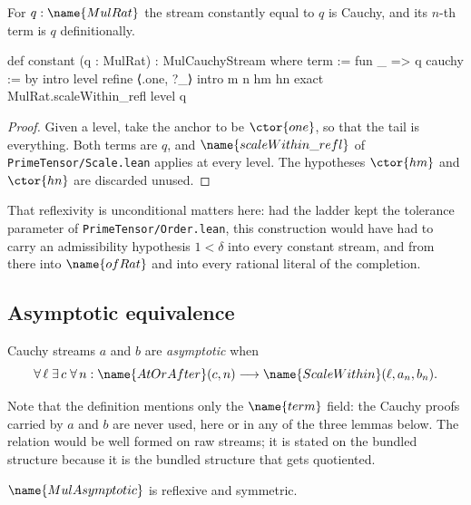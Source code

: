 \begin{lemma}
\label{Completion:lem:constant}
For $q : \name{MulRat}$ the stream constantly equal to $q$ is Cauchy, and its
$n$-th term is $q$ definitionally.
\end{lemma}

\begin{leancode}
def constant (q : MulRat) : MulCauchyStream where
  term := fun _ => q
  cauchy := by
    intro level
    refine ⟨.one, ?_⟩
    intro m n hm hn
    exact MulRat.scaleWithin_refl level q
\end{leancode}

\begin{proof}
Given a level, take the anchor to be $\ctor{one}$, so that the tail is
everything.  Both terms are $q$, and
$\name{scaleWithin\_refl}$ of \texttt{PrimeTensor/Scale.lean} applies at every
level.  The hypotheses $\ctor{hm}$ and $\ctor{hn}$ are discarded unused.
\end{proof}

That reflexivity is unconditional matters here: had the ladder kept the
tolerance parameter of \texttt{PrimeTensor/Order.lean}, this construction would
have had to carry an admissibility hypothesis $1 < \delta$ into every constant
stream, and from there into $\name{ofRat}$ and into every rational literal of
the completion.

\subsection{Asymptotic equivalence}

\begin{definition}\label{Completion:def:asymptotic}
Cauchy streams $a$ and $b$ are \emph{asymptotic} when
\[
  \forall\, \ell\; \exists\, c\; \forall\, n :
    \name{AtOrAfter}(c,n) \longrightarrow
    \name{ScaleWithin}(\ell, a_n, b_n).
\]
\end{definition}

Note that the definition mentions only the $\name{term}$ field: the Cauchy
proofs carried by $a$ and $b$ are never used, here or in any of the three
lemmas below.  The relation would be well formed on raw streams; it is stated
on the bundled structure because it is the bundled structure that gets
quotiented.

\begin{lemma}
\label{Completion:lem:refl-symm}
$\name{MulAsymptotic}$ is reflexive and symmetric.
\end{lemma}

